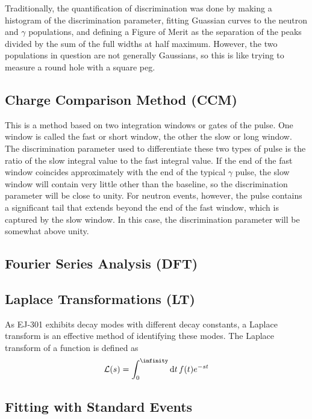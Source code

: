 Traditionally, the quantification of discrimination was done by making a histogram of the discrimination parameter, fitting Guassian curves to the neutron and $\gamma$ populations, and defining a Figure of Merit as the separation of the peaks divided by the sum of the full widths at half maximum. However, the two populations in question are not generally Gaussians, so this is like trying to measure a round hole with a square peg.

\subsection{Charge Comparison Method (CCM)}

This is a method based on two integration windows or gates of the pulse. One window is called the fast or short window, the other the slow or long window. The discrimination parameter used to differentiate these two types of pulse is the ratio of the slow integral value to the fast integral value. If the end of the fast window coincides approximately with the end of the typical $\gamma$ pulse, the slow window will contain very little other than the baseline, so the discrimination parameter will be close to unity. For neutron events, however, the pulse contains a significant tail that extends beyond the end of the fast window, which is captured by the slow window. In this case, the discrimination parameter will be somewhat above unity.

\subsection{Fourier Series Analysis (DFT)}

\subsection{Laplace Transformations (LT)}

As EJ-301 exhibits decay modes with different decay constants, a Laplace transform is an effective method of identifying these modes. The Laplace transform of a function is defined as
\begin{equation} \label{eq:laplace_transform}
\mathcal{L}(s) = \int_0^\infinity \n{d}t\,f(t)e^{-st}
\end{equation}

\subsection{Fitting with Standard Events}

